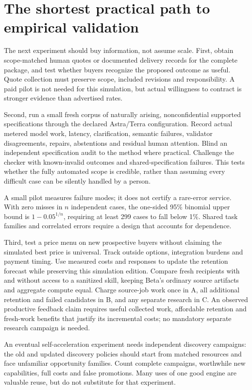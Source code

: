 \documentclass[11pt,letterpaper]{article}
\begin{document}
\section{The shortest practical path to empirical validation}
The next experiment should buy information, not assume scale. First, obtain scope-matched human quotes or documented delivery records for the complete package, and test whether buyers recognize the proposed outcome as useful. Quote collection must preserve scope, included revisions and responsibility. A paid pilot is not needed for this simulation, but actual willingness to contract is stronger evidence than advertised rates.

Second, run a small fresh corpus of naturally arising, nonconfidential supported specifications through the declared Astra/Terra configuration. Record actual metered model work, latency, clarification, semantic failures, validator disagreements, repairs, abstentions and residual human attention. Blind an independent specification audit to the method where practical. Challenge the checker with known-invalid outcomes and shared-specification failures. This tests whether the fully automated scope is credible, rather than assuming every difficult case can be silently handled by a person.

A small pilot measures failure modes; it does not certify a rare-error service. With zero misses in $n$ independent cases, the one-sided 95\% binomial upper bound is $1-0.05^{1/n}$, requiring at least 299 cases to fall below 1\%. Shared task families and correlated errors require a design that accounts for dependence.

Third, test a price menu on new prospective buyers without claiming the simulated best price is universal. Track outside options, integration burdens and payment timing. Use measured costs and responses to update the retention forecast while preserving this simulation edition. Compare fresh recipients with and without access to a sanitized skill, keeping Beta's ordinary source artifacts and aggregate compute equal. Charge source-job work once in A, all additional retention and failed candidates in B, and any separate research in C. An observed productive feedback claim requires useful collected work, affordable retention and fresh-work benefits that justify its incremental costs; no mandatory separate research campaign is needed.

An eventual self-acceleration experiment needs independent discovery campaigns: the old and updated discovery policies should start from matched resources and face unfamiliar opportunity families. Count complete campaigns, worthwhile new capabilities, full costs and false promotions. Many uses of one good engine are valuable reuse, but do not substitute for that experiment.
\end{document}
